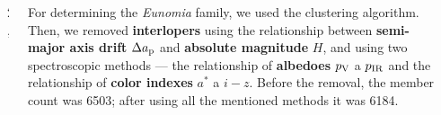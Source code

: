 \documentclass{beamer}
\newlength{\sep}
\newlength{\vyska}
\newlength{\vyskaB}
\newlength{\side}
\newlength{\main}
\begin{document}
\begin{frame}
\begin{columns}[t]
\begin{column}{\side}
\vspace{\sep}

\end{column}

\begin{column}{2\sep}
\end{column}

\begin{column}{\main}
\begin{tcolorbox}[title=Identification of members of the Eunomia family\vphantom{Úy},height=0.25\vyskaB]

	For determining the \textit{Eunomia} family, we used the clustering algorithm. Then, we removed \textbf{interlopers} using the relationship between \textbf{semi-major axis drift} $\Delta a_{\rm p}$ and \textbf{absolute magnitude} $H$, and using two spectroscopic methods --- the relationship of \textbf{albedoes} $p_{\rm V}$ a $p_{\rm IR}$ and the relationship of \textbf{color indexes} $a^*$ a $i-z$. Before the removal, the member count was 6503; after using all the mentioned methods it was 6184.

	\vspace{-1.7cm}


\end{tcolorbox}
\end{column}
\end{columns}
\end{frame}
\end{document}
